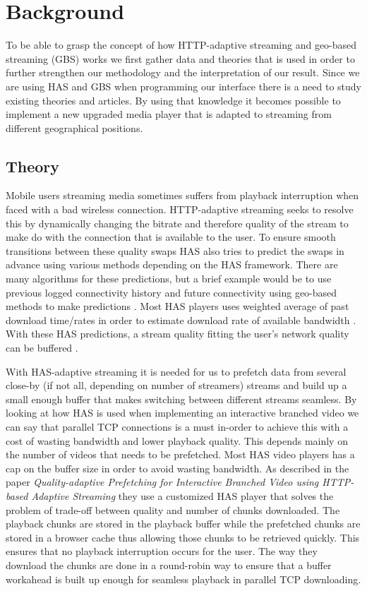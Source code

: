 \documentclass[9pt,a4paper]{acmproc}
\begin{document}
\section{Background}
To be able to grasp the concept of how HTTP-adaptive streaming and geo-based streaming (GBS) works we first gather data and theories that is used in order to further strengthen our methodology and the interpretation of our result. Since we are using HAS and GBS when programming our interface there is a need to study existing theories and articles. By using that knowledge it becomes possible to implement a new upgraded media player that is adapted to streaming from different geographical positions.


\subsection{Theory}
Mobile users streaming media sometimes suffers from playback interruption when faced with a bad wireless connection. HTTP-adaptive streaming seeks to resolve this by dynamically changing the bitrate and therefore quality of the stream to make do with the connection that is available to the user. To ensure smooth transitions between these quality swaps HAS also tries to predict the swaps in advance using various methods depending on the HAS framework. There are many algorithms for these predictions, but a brief example would be to use previous logged connectivity history and future connectivity using geo-based methods to make predictions \cite{gtube}. Most HAS players uses weighted average of past download time/rates in order to estimate download rate of available bandwidth \cite{qualbranch}. With these HAS predictions, a stream quality fitting the user’s network quality can be buffered \cite{gtube}.

With HAS-adaptive streaming it is needed for us to prefetch data from several close-by (if not all, depending on number of streamers) streams and build up a small enough buffer that makes switching between different streams seamless. By looking at how HAS is used when implementing an interactive branched video we can say that parallel TCP connections is a must in-order to achieve this with a cost of wasting bandwidth and lower playback quality. This depends mainly on the number of videos that needs to be prefetched. Most HAS video players has a cap on the buffer size in order to avoid wasting bandwidth. As described in the paper \textit{Quality-adaptive Prefetching for Interactive Branched Video using HTTP-based Adaptive Streaming} they use a customized HAS player that solves the problem of trade-off between quality and number of chunks downloaded. The playback chunks are stored in the playback buffer while the prefetched chunks are stored in a browser cache thus allowing those chunks to be retrieved quickly. This ensures that no playback interruption occurs for the user. The way they download the chunks are done in a round-robin way to ensure that a buffer workahead is built up enough for seamless playback in parallel TCP downloading. \cite{qualbranch} 
\end{document}
